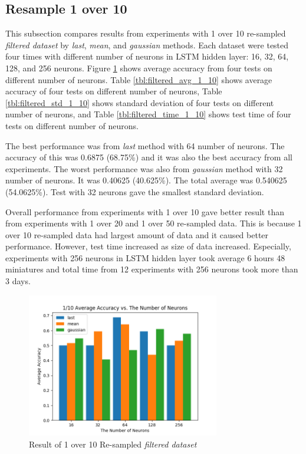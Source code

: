 \documentclass[draft,dvipsnames]{drexel-thesis}
\begin{document}
\begin{thesis}
\subsection{Resample 1 over 10}
This subsection compares results from experiments with 1 over 10 re-sampled {\em filtered dataset} by {\em last}, {\em mean}, and {\em gaussian} methods. Each dataset were tested four times with different number of neurons in LSTM hidden layer: 16, 32, 64, 128, and 256 neurons. Figure \ref{fig:filter_1_10} shows average accuracy from four tests on different number of neurons. Table \ref{tbl:filtered_avg_1_10} shows average accuracy of four tests on different number of neurons, Table \ref{tbl:filtered_std_1_10} shows standard deviation of four tests on different number of neurons, and Table \ref{tbl:filtered_time_1_10} shows test time of four tests on different number of neurons.

The best performance was from {\em last} method with 64 number of neurons. The accuracy of this was 0.6875 (68.75\%) and it was also the best accuracy from all experiments. The worst performance was also from {\em gaussian} method with 32 number of neurons. It was 0.40625 (40.625\%). The total average was 0.540625 (54.0625\%). Test with 32 neurons gave the smallest standard deviation.

Overall performance from experiments with 1 over 10 gave better result than from experiments with 1 over 20 and 1 over 50 re-sampled data. This is because 1 over 10 re-sampled data had largest amount of data and it caused better performance. However, test time increased as size of data increased. Especially, experiments with 256 neurons in LSTM hidden layer took average 6 hours 48 miniatures and total time from 12 experiments with 256 neurons took more than 3 days.

\begin{figure}[t!]
    \centering
    \includegraphics[width=0.75\textwidth]{pictures/result_pictures/filtered_1_10_result.png}
    \caption{Result of 1 over 10 Re-sampled {\em filtered dataset}}
    \label{fig:filter_1_10}
\end{figure}


\end{thesis}
\end{document}
